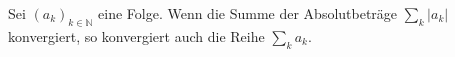 Sei $(a_k)_{k \in \mathbb{N}}$ eine Folge. Wenn die Summe der Absolutbeträge $\sum_k |a_k|$ konvergiert, so konvergiert auch die Reihe $\sum_k a_k$.